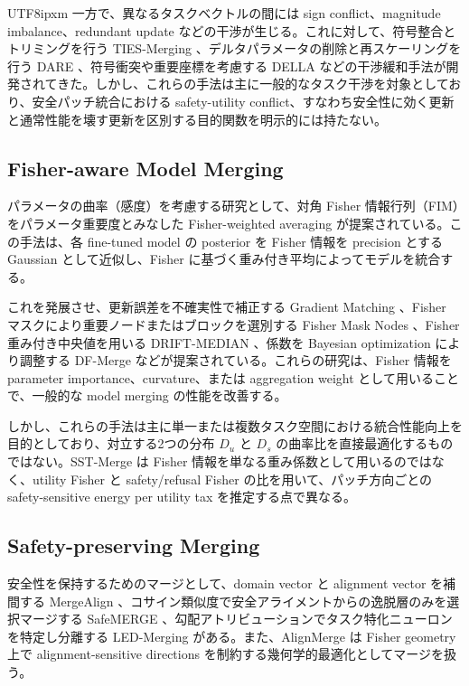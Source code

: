 \documentclass[letterpaper]{article} %
\begin{document}
\begin{CJK*}{UTF8}{ipxm}
一方で、異なるタスクベクトルの間には sign conflict、magnitude imbalance、redundant update などの干渉が生じる。これに対して、符号整合とトリミングを行う TIES-Merging \citep{yadav2023ties}、デルタパラメータの削除と再スケーリングを行う DARE \citep{yu2024language}、符号衝突や重要座標を考慮する DELLA \citep{deep2024della} などの干渉緩和手法が開発されてきた。しかし、これらの手法は主に一般的なタスク干渉を対象としており、安全パッチ統合における safety-utility conflict、すなわち安全性に効く更新と通常性能を壊す更新を区別する目的関数を明示的には持たない。

\subsection{Fisher-aware Model Merging}
パラメータの曲率（感度）を考慮する研究として、対角 Fisher 情報行列（FIM）をパラメータ重要度とみなした Fisher-weighted averaging \citep{matena2022merging} が提案されている。この手法は、各 fine-tuned model の posterior を Fisher 情報を precision とする Gaussian として近似し、Fisher に基づく重み付き平均によってモデルを統合する。

これを発展させ、更新誤差を不確実性で補正する Gradient Matching \citep{daheim2023matching}、Fisher マスクにより重要ノードまたはブロックを選別する Fisher Mask Nodes \citep{thennal2024fisher}、Fisher 重み付き中央値を用いる DRIFT-MEDIAN \citep{baban2025drift}、係数を Bayesian optimization により調整する DF-Merge \citep{sanwoo2025dynamic} などが提案されている。これらの研究は、Fisher 情報を parameter importance、curvature、または aggregation weight として用いることで、一般的な model merging の性能を改善する。

しかし、これらの手法は主に単一または複数タスク空間における統合性能向上を目的としており、対立する2つの分布 $D_u$ と $D_s$ の曲率比を直接最適化するものではない。SST-Merge は Fisher 情報を単なる重み係数として用いるのではなく、utility Fisher と safety/refusal Fisher の比を用いて、パッチ方向ごとの safety-sensitive energy per utility tax を推定する点で異なる。

\subsection{Safety-preserving Merging}
安全性を保持するためのマージとして、domain vector と alignment vector を補間する MergeAlign \citep{hammoud2024mergealign}、コサイン類似度で安全アライメントからの逸脱層のみを選択マージする SafeMERGE \citep{djuhera2025safemerge}、勾配アトリビューションでタスク特化ニューロンを特定し分離する LED-Merging \citep{ma2025led} がある。また、AlignMerge \citep{wang2025alignmerge} は Fisher geometry 上で alignment-sensitive directions を制約する幾何学的最適化としてマージを扱う。


\end{CJK*}
\end{document}
